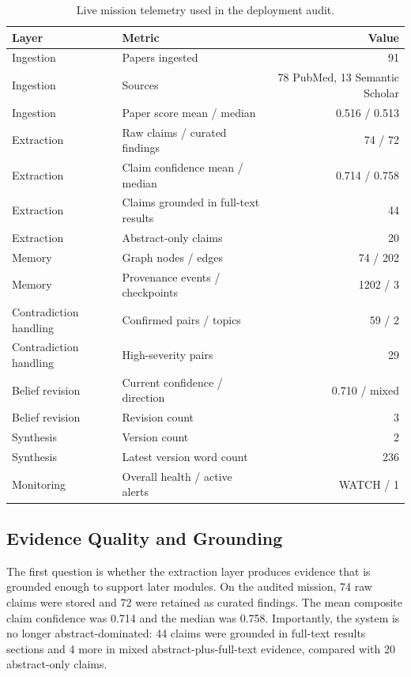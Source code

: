 \documentclass[manuscript,screen,review]{jair}
\begin{document}
\begin{table}[t]
  \caption{Live mission telemetry used in the deployment audit.}
  \label{tab:telemetry}
  \centering
  \begin{tabularx}{\textwidth}{@{}lXr@{}}
    \toprule
    Layer & Metric & Value \\
    \midrule
    Ingestion & Papers ingested & 91 \\
    Ingestion & Sources & 78 PubMed, 13 Semantic Scholar \\
    Ingestion & Paper score mean / median & 0.516 / 0.513 \\
    Extraction & Raw claims / curated findings & 74 / 72 \\
    Extraction & Claim confidence mean / median & 0.714 / 0.758 \\
    Extraction & Claims grounded in full-text results & 44 \\
    Extraction & Abstract-only claims & 20 \\
    Memory & Graph nodes / edges & 74 / 202 \\
    Memory & Provenance events / checkpoints & 1202 / 3 \\
    Contradiction handling & Confirmed pairs / topics & 59 / 2 \\
    Contradiction handling & High-severity pairs & 29 \\
    Belief revision & Current confidence / direction & 0.710 / mixed \\
    Belief revision & Revision count & 3 \\
    Synthesis & Version count & 2 \\
    Synthesis & Latest version word count & 236 \\
    Monitoring & Overall health / active alerts & WATCH / 1 \\
    \bottomrule
  \end{tabularx}
\end{table}

\subsection{Evidence Quality and Grounding}
The first question is whether the extraction layer produces evidence that is grounded enough to support later modules. On the audited mission, 74 raw claims were stored and 72 were retained as curated findings. The mean composite claim confidence was 0.714 and the median was 0.758. Importantly, the system is no longer abstract-dominated: 44 claims were grounded in full-text results sections and 4 more in mixed abstract-plus-full-text evidence, compared with 20 abstract-only claims.
\end{document}
